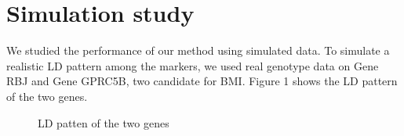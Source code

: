 \documentclass{article}
\begin{document}
    \section{Simulation study}

        We studied the performance of our method using simulated data. To simulate a realistic LD pattern among the markers, we used real genotype data on Gene RBJ and Gene GPRC5B, two candidate for BMI. Figure 1 shows the LD pattern of the two genes.

        \begin{figure}[htbp]
            \centering
            \hspace{10pt}
            \caption{LD patten of the two genes}
        \end{figure}
\end{document}
